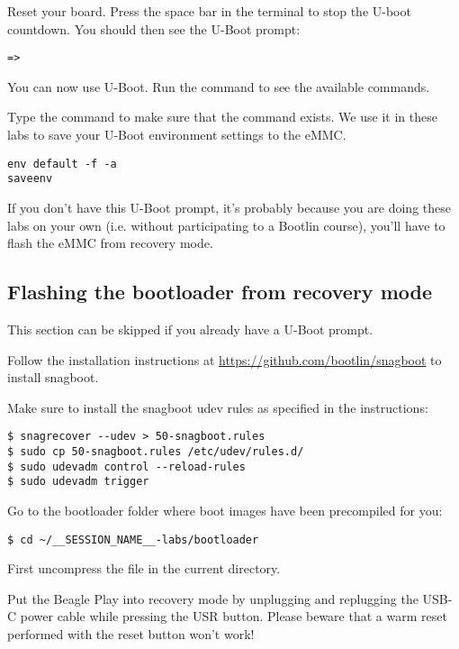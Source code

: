 Reset your board. Press the space bar in the
 terminal to stop the U-boot countdown. You should then see the
U-Boot prompt:

\begin{verbatim}
=>
\end{verbatim}

You can now use U-Boot. Run the  command to see the available
commands.

Type the  command to make sure that the
 command exists. We use it in these labs to
save your U-Boot environment settings to the eMMC.

\begin{verbatim}
env default -f -a
saveenv
\end{verbatim}

If you don't have this U-Boot prompt, it's probably because you are doing these labs on your own
(i.e. without participating to a Bootlin course), you'll have to flash the eMMC
from recovery mode.

\subsection{Flashing the bootloader from recovery mode}

This section can be skipped if you already have a U-Boot prompt.

Follow the installation instructions at
\url{https://github.com/bootlin/snagboot} to install snagboot.

Make sure to install the snagboot udev rules as specified in the instructions:
\begin{verbatim}
$ snagrecover --udev > 50-snagboot.rules
$ sudo cp 50-snagboot.rules /etc/udev/rules.d/
$ sudo udevadm control --reload-rules
$ sudo udevadm trigger
\end{verbatim}

Go to the bootloader folder where boot images have been precompiled for you:

\begin{verbatim}
$ cd ~/__SESSION_NAME__-labs/bootloader
\end{verbatim}

First uncompress the  file in the current directory.

Put the Beagle Play into recovery mode by unplugging and replugging the USB-C power
cable while pressing the USR button. Please beware that a warm reset performed
with the reset button won't work!

